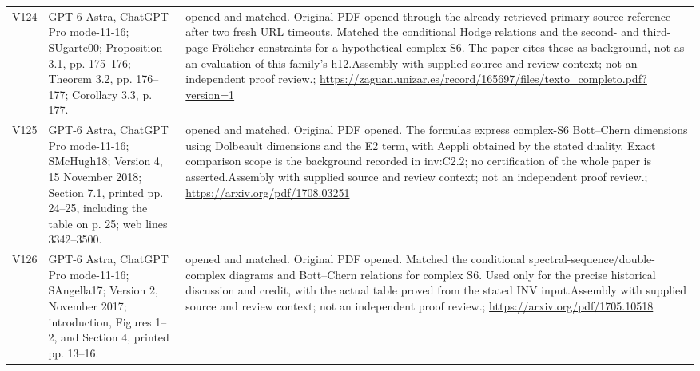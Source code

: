 \begin{longtable}{@{}L{.08\linewidth}L{.31\linewidth}L{.56\linewidth}@{}}
V124 & GPT-6 Astra, ChatGPT Pro mode-11-16; S\newline Ugarte00; Proposition 3.1, pp. 175--176; Theorem 3.2, pp. 176--177; Corollary 3.3, p. 177. & opened and matched. Original PDF opened through the already retrieved primary-source reference after two fresh URL timeouts. Matched the conditional Hodge relations and the second- and third-page Frölicher constraints for a hypothetical complex S6. The paper cites these as background, not as an evaluation of this family’s h12.\newline Assembly with supplied source and review context; not an independent proof review.\newline {}; \url{https://zaguan.unizar.es/record/165697/files/texto_completo.pdf?version=1}\\
V125 & GPT-6 Astra, ChatGPT Pro mode-11-16; S\newline McHugh18; Version 4, 15 November 2018; Section 7.1, printed pp. 24--25, including the table on p. 25; web lines 3342--3500. & opened and matched. Original PDF opened. The formulas express complex-S6 Bott--Chern dimensions using Dolbeault dimensions and the E2 term, with Aeppli obtained by the stated duality. Exact comparison scope is the background recorded in inv:\allowbreak{}C2.2; no certification of the whole paper is asserted.\newline Assembly with supplied source and review context; not an independent proof review.\newline {}; \url{https://arxiv.org/pdf/1708.03251}\\
V126 & GPT-6 Astra, ChatGPT Pro mode-11-16; S\newline Angella17; Version 2, November 2017; introduction, Figures 1--2, and Section 4, printed pp. 13--16. & opened and matched. Original PDF opened. Matched the conditional spectral-sequence/\allowbreak{}double-complex diagrams and Bott--Chern relations for complex S6. Used only for the precise historical discussion and credit, with the actual table proved from the stated INV input.\newline Assembly with supplied source and review context; not an independent proof review.\newline {}; \url{https://arxiv.org/pdf/1705.10518}\\

\end{longtable}
